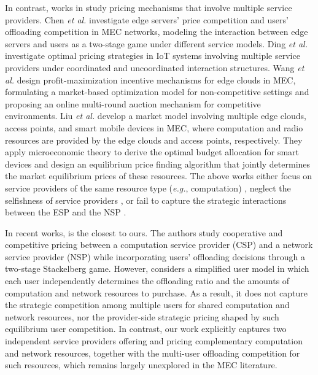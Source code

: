 \documentclass[lettersize,journal]{IEEEtran}
\newcommand{\eg}{\emph{e.g.}}
\newcommand{\etal}{\textit{et al.}}
\begin{document}
In contrast, works in \cite{chen2024price,ding2023optimal,wang2022profit,liu2022resource} study pricing mechanisms that involve multiple service providers.
Chen \etal \cite{chen2024price} investigate edge servers' price competition and users’ offloading competition in MEC networks, modeling the interaction between edge servers and users as a two-stage game under different service models. 
Ding \etal \cite{ding2023optimal} investigate optimal pricing strategies in IoT systems involving multiple service providers under coordinated and uncoordinated interaction structures.
Wang \etal \cite{wang2022profit} design profit-maximization incentive mechanisms for edge clouds in MEC, formulating a market-based optimization model for non-competitive settings and proposing an online multi-round auction mechanism for competitive environments. 
Liu \etal \cite{liu2022resource} develop a market model involving multiple edge clouds, access points, and smart mobile devices in MEC, where computation and radio resources are provided by the edge clouds and access points, respectively. They apply microeconomic theory to derive the optimal budget allocation for smart devices and design an equilibrium price finding algorithm that jointly determines the market equilibrium prices of these resources.
The above works either focus on service providers of the same resource type (\eg, computation) \cite{chen2024price,wang2022profit}, neglect the selfishness of service providers \cite{liu2022resource}, or fail to capture the strategic interactions between the ESP and the NSP \cite{ding2023optimal}.

In recent works, \cite{liao2026cooperative} is the closest to ours. The authors study cooperative and competitive pricing between a computation service provider (CSP) and a network service provider (NSP) while incorporating users' offloading decisions through a two-stage Stackelberg game. However, \cite{liao2026cooperative} considers a simplified user model in which each user independently determines the offloading ratio and the amounts of computation and network resources to purchase. As a result, it does not capture the strategic competition among multiple users for shared computation and network resources, nor the provider-side strategic pricing shaped by such equilibrium user competition. 
In contrast, our work explicitly captures two independent service providers offering and pricing complementary computation and network resources, together with the multi-user offloading competition for such resources, which remains largely unexplored in the MEC literature.
\end{document}

